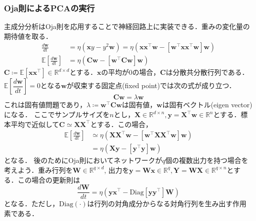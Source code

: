 \subsubsection{Oja則によるPCAの実行}
主成分分析はOja則を応用することで神経回路上に実装できる．重みの変化量の期待値を取る．
\begin{align}
\frac{d\mathbf{w}}{dt} &= \eta \left(\mathbf{x}y - y^2 \mathbf{w}\right)=\eta \left(\mathbf{x}\mathbf{x}^\top \mathbf{w} - \left[\mathbf{w}^\top \mathbf{x}\mathbf{x}^\top \mathbf{w}\right] \mathbf{w}\right)\\
\mathbb{E}\left[\frac{d\mathbf{w}}{dt}\right] &= \eta \left(\mathbf{C} \mathbf{w} - \left[\mathbf{w}^\top \mathbf{C} \mathbf{w}\right] \mathbf{w}\right)
\end{align}
$\mathbf{C}\coloneqq \mathbb{E}[\mathbf{x}\mathbf{x}^\top]\in \mathbb{R}^{d\times d}$とする．$\mathbf{x}$の平均が0の場合，$\mathbf{C}$は分散共分散行列である．$\mathbb{E}\left[\dfrac{d\mathbf{w}}{dt}\right]=0$となる$\mathbf{w}$が収束する固定点(fixed point)では次の式が成り立つ．
\begin{equation}
\mathbf{C}\mathbf{w} = \lambda \mathbf{w}
\end{equation}
これは固有値問題であり，$\lambda\coloneqq \mathbf{w}^\top \mathbf{C} \mathbf{w}$は固有値，$\mathbf{w}$は固有ベクトル(eigen vector)になる．
ここでサンプルサイズを$n$とし，$\mathbf{X} \in \mathbb{R}^{d\times n}, \mathbf{y}=\mathbf{X}^\top\mathbf{w} \in \mathbb{R}^n$とする．標本平均で近似して$\mathbf{C}\simeq \mathbf{X}\mathbf{X}^\top$とする．この場合，
\begin{align}
\mathbb{E}\left[\frac{d\mathbf{w}}{dt}\right] &\simeq \eta \left(\mathbf{X}\mathbf{X}^\top \mathbf{w} - \left[\mathbf{w}^\top \mathbf{X}\mathbf{X}^\top \mathbf{w}\right] \mathbf{w}\right)\\
&=\eta \left(\mathbf{X}\mathbf{y} - \left[\mathbf{y}^\top\mathbf{y}\right] \mathbf{w}\right)
\end{align}
となる．
後のためにOja則においてネットワークが$q$個の複数出力を持つ場合を考えよう．重み行列を$\mathbf{W} \in \mathbb{R}^{q\times d}$, 出力を$\mathbf{y}=\mathbf{W}\mathbf{x} \in \mathbb{R}^{q}, \mathbf{Y}=\mathbf{W}\mathbf{X} \in \mathbb{R}^{q\times n}$とする．この場合の更新則は
\begin{equation}
\frac{d\mathbf{W}}{dt} = \eta \left(\mathbf{y}\mathbf{x}^\top - \mathrm{Diag}\left[\mathbf{y}\mathbf{y}^\top\right] \mathbf{W}\right)
\end{equation}
となる．ただし，$\mathrm{Diag}(\cdot)$は行列の対角成分からなる対角行列を生み出す作用素である．
